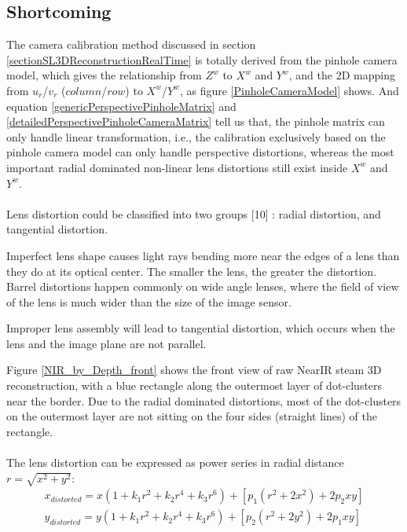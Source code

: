 \subsection{Shortcoming}
The camera calibration method discussed in section \ref{sectionSL3DReconstructionRealTime} is totally derived from the pinhole camera model, which gives the relationship from \(Z^w\) to \(X^w\) and \(Y^w\), and the 2D mapping from \(u_r\)/\(v_r\) (\(column\)/\(row\)) to \(X^w\)/\(Y^w\), as figure \ref{PinholeCameraModel} shows. And equation \ref{genericPerspectivePinholeMatrix} and \ref{detailedPerspectivePinholeCameraMatrix} tell us that, the pinhole matrix can only handle linear transformation, i.e., the calibration exclusively based on the pinhole camera model can only handle perspective distortions, whereas the most important radial dominated non-linear lens distortions still exist inside \(X^w\) and \(Y^w\).%
%
\\\\%
Lens distortion could be classified into two groups [10] : radial distortion, and tangential distortion.\par
%
Imperfect lens shape causes light rays bending more near the edges of a lens than they do at its optical center. The smaller the lens, the greater the distortion. Barrel distortions happen commonly on wide angle lenses, where the field of view of the lens is much wider than the size of the image sensor.\par%
Improper lens assembly will lead to tangential distortion, which occurs when the lens and the image plane are not parallel.\par%
%
%
Figure \ref{NIR_by_Depth_front} shows the front view of raw NearIR steam 3D reconstruction, with a blue rectangle along the outermost layer of dot-clusters near the border. Due to the radial dominated distortions, most of the dot-clusters on the outermost layer are not sitting on the four sides (straight lines) of the rectangle.\\\\
%
The lens distortion can be expressed as power series in radial distance \(r = \sqrt{x^2 + y^2}\):
\begin{equation}
%
\begin{aligned}
x_{distorted} =  x (1 + k_1 r^2 + k_2 r^4 + k_3 r^6) + [p_1 (r^2 + 2 x^2) + 2 p_2 xy] %
\\%
y_{distorted} =  y (1 + k_1 r^2 + k_2 r^4 + k_3 r^6) + [p_2 (r^2 + 2 y^2) + 2 p_1 xy]
\end{aligned}
\label{lensDistortion}
%
\end{equation}%
